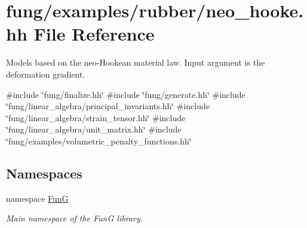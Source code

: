 \hypertarget{neo__hooke_8hh}{\section{fung/examples/rubber/neo\-\_\-hooke.hh \-File \-Reference}
\label{neo__hooke_8hh}
}


\-Models based on the neo-\/\-Hookean material law. \-Input argument is the deformation gradient.  


{\ttfamily \#include \char`\"{}fung/finalize.\-hh\char`\"{}}\*
{\ttfamily \#include \char`\"{}fung/generate.\-hh\char`\"{}}\*
{\ttfamily \#include \char`\"{}fung/linear\-\_\-algebra/principal\-\_\-invariants.\-hh\char`\"{}}\*
{\ttfamily \#include \char`\"{}fung/linear\-\_\-algebra/strain\-\_\-tensor.\-hh\char`\"{}}\*
{\ttfamily \#include \char`\"{}fung/linear\-\_\-algebra/unit\-\_\-matrix.\-hh\char`\"{}}\*
{\ttfamily \#include \char`\"{}fung/examples/volumetric\-\_\-penalty\-\_\-functions.\-hh\char`\"{}}\*
\subsection*{\-Namespaces}
\begin{DoxyCompactItemize}
\item 
namespace \hyperlink{namespaceFunG}{\-Fun\-G}
\begin{DoxyCompactList}\small\item\em \-Main namespace of the \-Fun\-G library. \end{DoxyCompactList}\end{DoxyCompactItemize}
